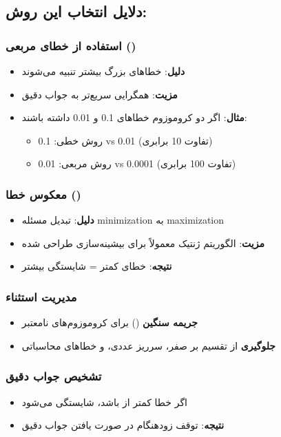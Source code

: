 \documentclass[12pt,a4paper]{article}
\begin{document}
	\subsection{دلایل انتخاب این روش:}
	
	\subsubsection{استفاده از خطای مربعی ()}
	\begin{itemize}
		\item \textbf{دلیل}: خطاهای بزرگ بیشتر تنبیه می‌شوند
		\item \textbf{مزیت}: همگرایی سریع‌تر به جواب دقیق
		\item \textbf{مثال}: اگر دو کروموزوم خطاهای 0.1 و 0.01 داشته باشند:
		\begin{itemize}
			\item روش خطی: 0.1 vs 0.01 (تفاوت 10 برابری)
			\item روش مربعی: 0.01 vs 0.0001 (تفاوت 100 برابری)
		\end{itemize}
	\end{itemize}
	
	\subsubsection{معکوس خطا ()}
	\begin{itemize}
		\item \textbf{دلیل}: تبدیل مسئله minimization به maximization
		\item \textbf{مزیت}: الگوریتم ژنتیک معمولاً برای بیشینه‌سازی طراحی شده
		\item \textbf{نتیجه}: خطای کمتر = شایستگی بیشتر
	\end{itemize}
	
	\subsubsection{مدیریت استثناء}
	\begin{itemize}
		\item \textbf{جریمه سنگین} () برای کروموزوم‌های نامعتبر
		\item \textbf{جلوگیری} از تقسیم بر صفر، سرریز عددی، و خطاهای محاسباتی
	\end{itemize}
	
	\subsubsection{تشخیص جواب دقیق}
	\begin{itemize}
		\item اگر خطا کمتر از  باشد، شایستگی  می‌شود
		\item \textbf{نتیجه}: توقف زودهنگام در صورت یافتن جواب دقیق
	\end{itemize}
	
\end{document}

